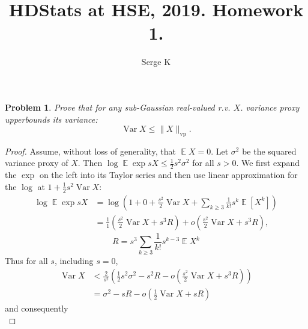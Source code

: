 \documentclass{article}
\title{HDStats at HSE, 2019. Homework 1.}
\author{Serge K}
\newtheorem{problem}{Problem}
\newcommand{\expect}{\operatorname{\mathbb{E}}}
\begin{document}
\maketitle

\begin{problem}
    Prove that
    for any sub-Gaussian real-valued r.v. \( X \).
    variance proxy upperbounds its variance:
    \[
        \operatorname{Var}X \leq \|X\|_{\mathrm{vp}}.
    \]
\end{problem}
\begin{proof}
    Assume, without loss of generality, that \( \expect X = 0\).
    Let \( \sigma^2 \) be the squared variance proxy of \( X \).
    Then \( \log \expect \exp sX \leq \frac12 s^2 \sigma^2 \)
    for all \( s > 0 \).
    We first expand the \( \exp \) on the left into its Taylor series
    and then use linear approximation for the \( \log \)
    at \( 1 + \frac12 s^2\operatorname{Var}X \):
    \[\begin{split}
        \log \expect \exp sX
        &= \log \left( 1 + 0 + \frac{s^2}{2} \operatorname{Var} X
        + \sum_{k\geq 3} \frac{1}{k!}s^k\expect[X^k]
    \right)
    \\
        &= \frac{1}{1}(\frac{s^2}{2} \operatorname{Var}X + s^3 R)
        + o(\frac{s^2}{2} \operatorname{Var}X + s^3 R),
    \end{split} \]
    \[
        R = s^3\sum_{k\geq3} \frac{1}{k!}s^{k-3}\expect X^k
    \]
    Thus for all \( s \), including \( s=0 \),
    \[\begin{split}
        \operatorname{Var}X
        &< \frac{2}{s^2}\left(\frac12 s^2\sigma^2 - s^2R
        - o(\frac{s^2}{2} \operatorname{Var}X + s^3R)\right)
        \\
        &= \sigma^2 - sR - o(\frac12{\operatorname{Var}X + sR})
\end{split}\]
    and consequently
    \[
    \]
\end{proof}
\end{document}
